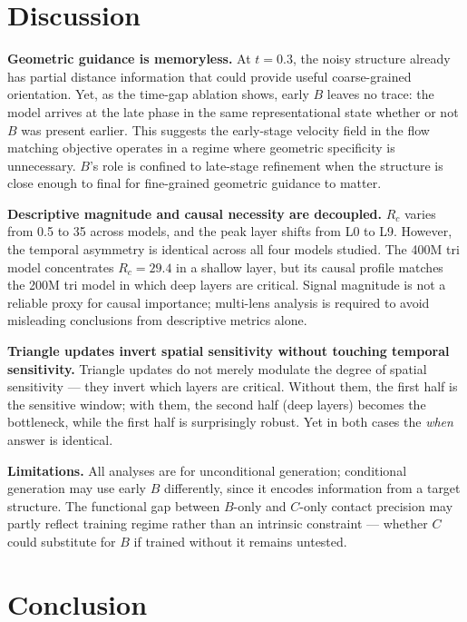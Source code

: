\documentclass{article}
\begin{document}
\section{Discussion}
\label{sec:discussion}

\textbf{Geometric guidance is memoryless.}
At $t{=}0.3$, the noisy structure already has partial distance information that could provide useful coarse-grained orientation.
Yet, as the time-gap ablation shows, early $B$ leaves no trace: the model arrives at the late phase in the same representational state whether or not $B$ was present earlier.
This suggests the early-stage velocity field in the flow matching objective operates in a regime where geometric specificity is unnecessary. $B$'s role is confined to late-stage refinement when the structure is close enough to final for fine-grained geometric guidance to matter.

\textbf{Descriptive magnitude and causal necessity are decoupled.}
$R_c$ varies from 0.5 to 35 across models, and the peak layer shifts from L0 to L9. However, the temporal asymmetry is identical across all four models studied.
The 400M tri model concentrates $R_c = 29.4$ in a shallow layer, but its causal profile matches the 200M tri model in which deep layers are critical.
Signal magnitude is not a reliable proxy for causal importance; multi-lens analysis is required to avoid misleading conclusions from descriptive metrics alone.

\textbf{Triangle updates invert spatial sensitivity without touching temporal sensitivity.}
Triangle updates do not merely modulate the degree of spatial sensitivity --- they invert which layers are critical.
Without them, the first half is the sensitive window; with them, the second half (deep layers) becomes the bottleneck, while the first half is surprisingly robust.
Yet in both cases the \emph{when} answer is identical.

\textbf{Limitations.}
All analyses are for unconditional generation; conditional generation may use early $B$ differently, since it encodes information from a target structure.
The functional gap between $B$-only and $C$-only contact precision may partly reflect training regime rather than an intrinsic constraint --- whether $C$ could substitute for $B$ if trained without it remains untested.

\section{Conclusion}
\end{document}
